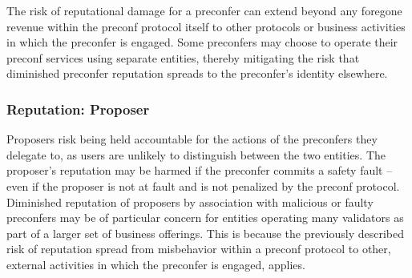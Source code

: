 \documentclass[a4paper]{article}
\theoremstyle{boldstyle}
\newcommand{\cm}[1]{\textcolor{blue}{\textbf{Conor:} #1}}
\begin{document}
    The risk of reputational damage for a preconfer can extend beyond any foregone revenue within the preconf protocol itself to other protocols or business activities in which the preconfer is engaged. 
    Some preconfers may choose to operate their preconf services using separate entities, thereby mitigating the risk that diminished preconfer reputation spreads to the preconfer's identity elsewhere.
    

    \subsubsection{Reputation: Proposer}
    \label{risk_reputation:proposer}
        Proposers risk being held accountable for the actions of the preconfers they delegate to, as users are unlikely to distinguish between the two entities. 
        The proposer’s reputation may be harmed if the preconfer commits a safety fault -- even if the proposer is not at fault and is not penalized by the preconf protocol.
        Diminished reputation of proposers by association with malicious or faulty preconfers may be of particular concern for entities operating many validators as part of a larger set of business offerings. 
        This is because the previously described risk of reputation spread from misbehavior within a preconf protocol to other, external activities in which the preconfer is engaged, applies. %
    
\end{document}
